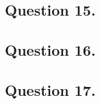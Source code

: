 \documentclass{mhk}
\begin{document}
\subsection*{Question 15.}





\subsection*{Question 16.}





\subsection*{Question 17.}




\end{document}
